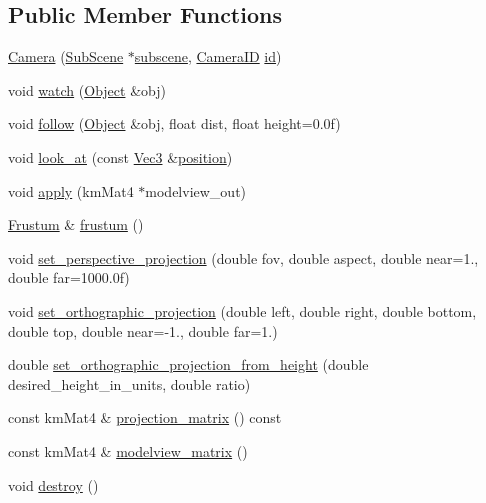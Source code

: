 \subsection*{Public Member Functions}
\begin{DoxyCompactItemize}
\item 
\hyperlink{classkglt_1_1_camera_a42c3063735ffccb3d582168c3c717f3b}{Camera} (\hyperlink{classkglt_1_1_sub_scene}{Sub\-Scene} $\ast$\hyperlink{classkglt_1_1_object_a857d97844a3a56aeb8f0a180b7cf592f}{subscene}, \hyperlink{namespacekglt_a2a2b79f136b052b58ec737bd9c885429}{Camera\-I\-D} \hyperlink{classkglt_1_1generic_1_1_identifiable_a7930d0f7da424ad524d888726fcc12bd}{id})
\item 
void \hyperlink{classkglt_1_1_camera_a5cce0dca49250b3260d10fec6198a330}{watch} (\hyperlink{classkglt_1_1_object}{Object} \&obj)
\item 
void \hyperlink{classkglt_1_1_camera_aa3be6d31a24a292a045c0be98ec67785}{follow} (\hyperlink{classkglt_1_1_object}{Object} \&obj, float dist, float height=0.\-0f)
\item 
void \hyperlink{classkglt_1_1_camera_ae9a010d285b3d95f85fd4305d99492c1}{look\-\_\-at} (const \hyperlink{structkglt_1_1_vec3}{Vec3} \&\hyperlink{classkglt_1_1_object_ab103a09c02763d7fc519629292d95200}{position})
\item 
void \hyperlink{classkglt_1_1_camera_a18ab11dcc8431b743e43de9945110dd3}{apply} (km\-Mat4 $\ast$modelview\-\_\-out)
\item 
\hyperlink{classkglt_1_1_frustum}{Frustum} \& \hyperlink{classkglt_1_1_camera_a5a0bda79354de75d7ab11071ec3b1363}{frustum} ()
\item 
void \hyperlink{classkglt_1_1_camera_a829c16cd30b218421a85461503354bb2}{set\-\_\-perspective\-\_\-projection} (double fov, double aspect, double near=1., double far=1000.\-0f)
\item 
void \hyperlink{classkglt_1_1_camera_a1e5a5585e4cf9007219a7c25fa18964f}{set\-\_\-orthographic\-\_\-projection} (double left, double right, double bottom, double top, double near=-\/1., double far=1.)
\item 
double \hyperlink{classkglt_1_1_camera_a0a9f7d359682b4f4acd4d0ea335980d7}{set\-\_\-orthographic\-\_\-projection\-\_\-from\-\_\-height} (double desired\-\_\-height\-\_\-in\-\_\-units, double ratio)
\item 
const km\-Mat4 \& \hyperlink{classkglt_1_1_camera_a08a31782c508b4ad37f643b67e43aab4}{projection\-\_\-matrix} () const 
\item 
const km\-Mat4 \& \hyperlink{classkglt_1_1_camera_af11ff86b7a0139711403767c5cb955f0}{modelview\-\_\-matrix} ()
\item 
void \hyperlink{classkglt_1_1_camera_abf4558388f1e6eb8c69660981e3743e0}{destroy} ()
\end{DoxyCompactItemize}
